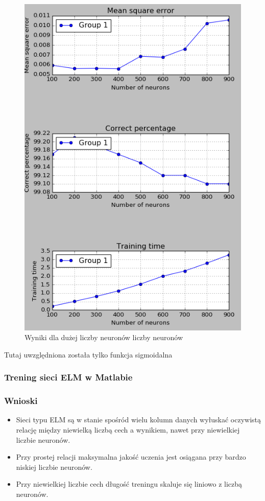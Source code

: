 \documentclass{article}
\begin{document}
\begin{figure}[H]
\centering
\includegraphics[width=\textwidth]{wyniki_dota2_python_performance.png}
\caption{Wyniki dla dużej liczby neuronów liczby neuronów}
\end{figure}
Tutaj uwzględniona została tylko funkcja sigmoidalna

\subsubsection{Trening sieci ELM w Matlabie}
\subsubsection{Wnioski}
\begin{itemize}
\item Sieci typu ELM są w stanie spośród wielu kolumn danych wyłuskać oczywistą relację między niewielką liczbą cech a wynikiem, nawet przy niewielkiej liczbie neuronów.
\item Przy prostej relacji maksymalna jakość uczenia jest osiągana przy bardzo niskiej liczbie neuronów.
\item Przy niewielkiej liczbie cech długość treningu skaluje się liniowo z liczbą neuronów.
\end{itemize}
\end{document}
